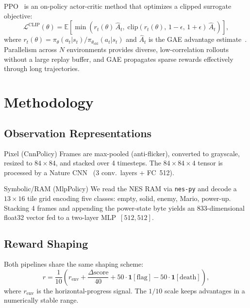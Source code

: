 \documentclass[10pt,a4paper,twocolumn]{article}
\begin{document}
PPO~\cite{schulman2017proximal} is an on-policy actor-critic method that
optimizes a clipped surrogate objective:
\begin{equation}
  \mathcal{L}^{\mathrm{CLIP}}(\theta)
  = \mathbb{E}\!\left[\min\!\left(
      r_t(\theta)\,\hat{A}_t,\;
      \mathrm{clip}(r_t(\theta),\,1{-}\epsilon,\,1{+}\epsilon)\,\hat{A}_t
    \right)\right],
  \label{eq:ppo}
\end{equation}
where $r_t(\theta)=\pi_\theta(a_t|s_t)/\pi_{\theta_\mathrm{old}}(a_t|s_t)$
and $\hat{A}_t$ is the GAE advantage estimate~\cite{schulman2017proximal}.
Parallelism across $N$ environments provides diverse, low-correlation
rollouts without a large replay buffer, and GAE propagates sparse rewards
effectively through long trajectories.

\section{Methodology}

\subsection{Observation Representations}

\begin{keybox}{Pixel (CnnPolicy)}
Frames are max-pooled (anti-flicker), converted to grayscale, resized to
$84\!\times\!84$, and stacked over 4 timesteps.
The $84\!\times\!84\!\times\!4$ tensor is processed by a Nature
CNN~\cite{mnih2015human} (3 conv.\ layers + FC~512).
\end{keybox}

\begin{keybox}{Symbolic/RAM (MlpPolicy)}
We read the NES RAM via \texttt{nes-py} and decode a $13\!\times\!16$ tile
grid encoding five classes: empty, solid, enemy, Mario, power-up.
Stacking 4 frames and appending the power-state byte yields an
833-dimensional float32 vector fed to a two-layer MLP~$[512, 512]$.
\end{keybox}

\subsection{Reward Shaping}

Both pipelines share the same shaping scheme:
\begin{equation}
  r = \frac{1}{10}\!\left(
    r_{\text{env}}
    + \frac{\Delta\mathrm{score}}{40}
    + 50\cdot\mathbf{1}[\text{flag}]
    - 50\cdot\mathbf{1}[\text{death}]
  \right),
  \label{eq:reward}
\end{equation}
where $r_{\text{env}}$ is the horizontal-progress signal.
The $1/10$ scale keeps advantages in a numerically stable range.
\end{document}
